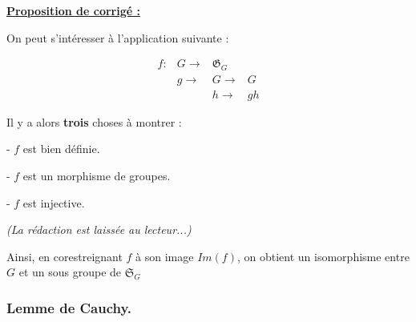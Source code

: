 \textbf{\underline{Proposition de corrigé : }}

On peut s'intéresser à l'application suivante : 

$$
\begin{aligned}
f:&G\longrightarrow &\mathfrak{G}_G \\
  &g \rightarrow &G\rightarrow &G \\ 
  & &h \rightarrow &gh              
\end{aligned}
$$

Il y a alors \textbf{trois} choses à montrer : 

- $f$ est bien définie. 

- $f$ est un morphisme de groupes.

- $f$ est injective. 

\textit{(La rédaction est laissée au lecteur...) }

Ainsi, en corestreignant $f$ à son image $Im(f)$, on obtient 
un isomorphisme entre $G$ et un sous groupe de $\mathfrak{S}_G$

\subsubsection{Lemme de Cauchy.}
